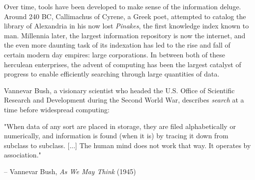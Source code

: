 


Over time, tools have been developed to make sense of the information deluge. Around 240 BC, Callimachus of Cyrene, a Greek poet, attempted to catalog the library of Alexandria in his now lost \emph{Pinakes}, the first knowledge index known to man. Millennia later, the largest information repository is now the internet, and the even more daunting task of its indexation has led to the rise and fall of certain modern day empires: large corporations. In between both of these herculean enterprises, the advent of computing has been the largest catalyst of progress to enable efficiently searching through large quantities of data.


Vannevar Bush, a visionary scientist who headed the U.S. Office of Scientific Research and Development during the Second World War, describes \emph{search} at a time before widespread computing:

\begin{lavenderkaobox}
    "When data of any sort are placed in storage, they are filed alphabetically or numerically, and information is found (when it is) by tracing it down from subclass to subclass. [...] The human mind does not work that way. It operates by association."

    \flushright -- Vannevar Bush, \emph{As We May Think} (1945)
\end{lavenderkaobox}

